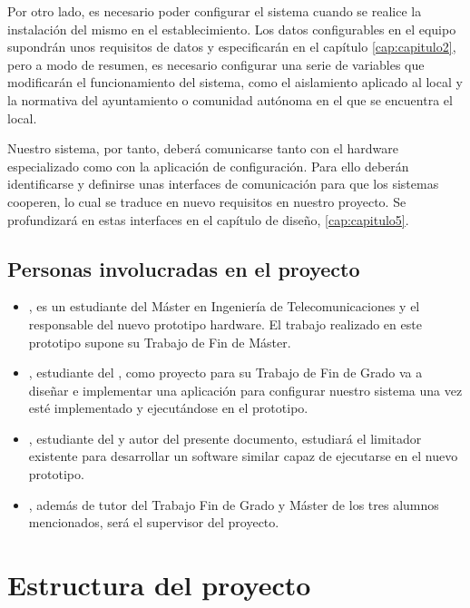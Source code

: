 Por otro lado, es necesario poder configurar el sistema cuando se realice la instalación del mismo en el establecimiento. Los datos configurables en el equipo supondrán unos requisitos de datos y especificarán en el capítulo \ref{cap:capitulo2}, pero a modo de resumen, es necesario configurar una serie de variables que modificarán el funcionamiento del sistema, como el aislamiento aplicado al local y la normativa del ayuntamiento o comunidad autónoma en el que se encuentra el local.

Nuestro sistema, por tanto, deberá comunicarse tanto con el hardware especializado como con la aplicación de configuración. Para ello deberán identificarse y definirse unas interfaces de comunicación para que los sistemas cooperen, lo cual se traduce en nuevo requisitos en nuestro proyecto. Se profundizará en estas interfaces en el capítulo de diseño, \ref{cap:capitulo5}.

\subsection{Personas involucradas en el proyecto} \label{sec:team}

\begin{itemize}
	\item \myMateLuis, es un estudiante del Máster en Ingeniería de Telecomunicaciones y el responsable del nuevo prototipo hardware. El trabajo realizado en este prototipo supone su Trabajo de Fin de Máster.

	\item \myMateDani, estudiante del \myDegree, como proyecto para su Trabajo de Fin de Grado va a diseñar e implementar una aplicación para configurar nuestro sistema una vez esté implementado y ejecutándose en el prototipo.

	\item \myName, estudiante del \myDegree y autor del presente documento, estudiará el limitador existente para desarrollar un software similar capaz de ejecutarse en el nuevo prototipo.

	\item \myProf, además de tutor del Trabajo Fin de Grado y Máster de los tres alumnos mencionados, será el supervisor del proyecto.
\end{itemize}


\section{Estructura del proyecto}\label{sec:estructura}

